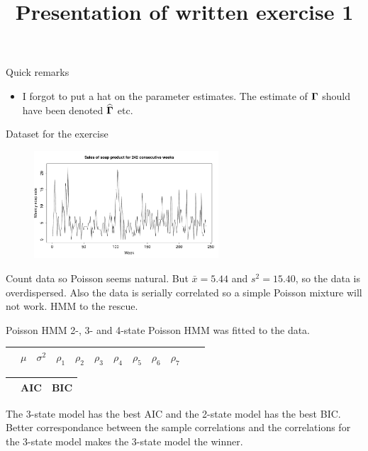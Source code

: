 

\title[Presentation of exercise 1]{Presentation of written exercise 1}


\begin{frame}
\titlepage
\end{frame}


\begin{frame}{Quick remarks}
    \begin{itemize}
    \item I forgot to put a hat on the parameter estimates. The estimate of $\boldsymbol{\Gamma}$ should have been denoted $\widehat{\boldsymbol{\Gamma}}$ etc.
    \end{itemize}
\end{frame}


\begin{frame}{Dataset for the exercise}
\begin{figure}[ht]
\includegraphics[width=260px]{../plots/sales-series.pdf}
\end{figure}
\vspace{-0.5cm}
Count data so Poisson seems natural. But $\bar{x}=5.44$ and $s^2=15.40$, so the data is overdispersed. Also the data is serially correlated so a simple Poisson mixture will not work. HMM to the rescue.
\end{frame}

\begin{frame}{Poisson HMM}
    2-, 3- and 4-state Poisson HMM was fitted to the data.
    \begin{table}[ht]
        \tiny
        \centering
        \begin{tabular}{cccccccccccc}
            \hline
             & $\mu$ & $\sigma^2$ & $\rho_1$ & $\rho_2$ & $\rho_3$ & $\rho_4$ & $\rho_5$ & $\rho_6$ & $\rho_7$ \\\hline
            
        \end{tabular}
    \end{table}
    \begin{table}[ht]
        \tiny
        \centering
        \begin{tabular}{ccc}
            \hline
             & AIC & BIC \\\hline
            
        \end{tabular}
    \end{table}
    The 3-state model has the best AIC and the 2-state model has the best BIC. Better correspondance between the sample correlations and the correlations for the 3-state model makes the 3-state model the winner.
\end{frame}

